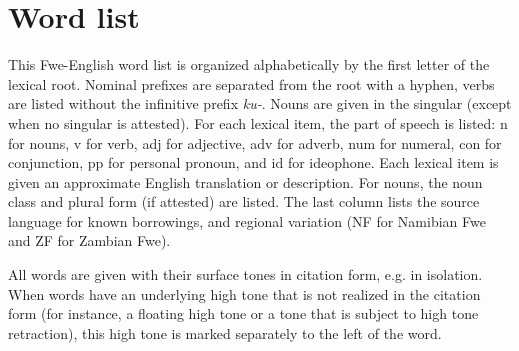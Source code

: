 \chapter{Word list}
\hypertarget{Toc75352722}{}
This Fwe-English word list is organized alphabetically by the first letter of the lexical root. Nominal prefixes are separated from the root with a hyphen, verbs are listed without the infinitive prefix \textit{ku-}. Nouns are given in the singular (except when no singular is attested). For each lexical item, the part of speech is listed: n for nouns, v for verb, adj for adjective, adv for adverb, num for numeral, con for conjunction, pp for personal pronoun, and id for ideophone. Each lexical item is given an approximate English translation or description. For nouns, the noun class and plural form (if attested) are listed. The last column lists the source language for known borrowings, and regional variation (NF for Namibian Fwe and ZF for Zambian Fwe).


All words are given with their surface tones in citation form, e.g. in isolation. When words have an underlying high tone that is not realized in the citation form (for instance, a floating high tone or a tone that is subject to high tone retraction), this high tone is marked separately to the left of the word.



